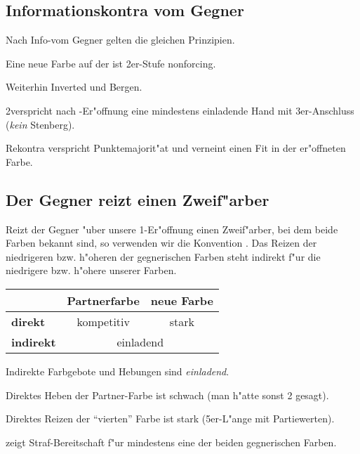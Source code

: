 \subsection{Informationskontra vom Gegner}

Nach Info-\kontra vom Gegner gelten die gleichen Prinzipien.
\begin{compactitem}
\item Eine neue Farbe auf der ist 2er-Stufe nonforcing.
\item Weiterhin Inverted und Bergen.
\item 2\SA verspricht nach \ofa-Er"offnung eine mindestens einladende Hand mit
  3\pl{}er-Anschluss (\emph{kein} Stenberg).
\item Rekontra verspricht Punktemajorit"at und verneint einen Fit in der
  er"offneten Farbe.
\end{compactitem}

\subsection{Der Gegner reizt einen Zweif"arber }

Reizt der Gegner "uber unsere 1\anybid-Er"offnung einen Zweif"arber, bei
dem beide Farben bekannt sind, so verwenden wir die Konvention
. Das Reizen der niedrigeren bzw. h"oheren der
gegnerischen Farben steht indirekt f"ur die niedrigere bzw. h"ohere unserer Farben.
%
\begin{center}
\begin{tabular}[t]{|l|c|c|}
\hline
 & \textbf{Partnerfarbe} & \textbf{neue Farbe}\\
\hline
\hline
\textbf{direkt} & kompetitiv & stark \\
\hline
\textbf{indirekt} & \multicolumn{2}{c|}{einladend}\\
\hline
\end{tabular}
\end{center}

\begin{compactitem}
\item Indirekte Farbgebote und Hebungen sind \emph{einladend}.
\item Direktes Heben der Partner-Farbe ist schwach (man h"atte sonst 2\anybid
  gesagt).
\item Direktes Reizen der "`vierten"' Farbe ist stark (5\pl{}er-L"ange mit
  Partiewerten).
\item {} zeigt Straf-Bereitschaft f"ur mindestens eine der
  beiden gegnerischen Farben.
\end{compactitem}


